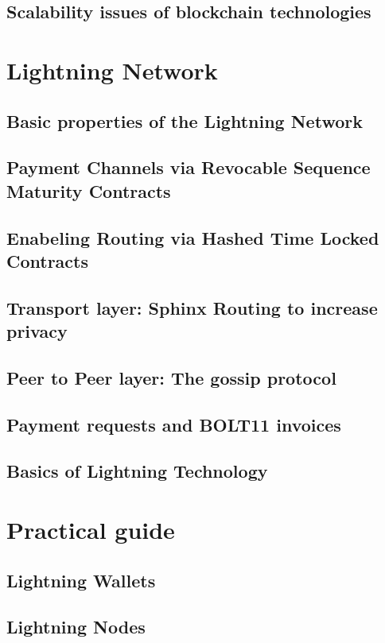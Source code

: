 \documentclass[a4paper,12pt,oneside,openany]{book}
\begin{document}


\section{Scalability issues of blockchain technologies}
\chapter{Lightning Network}
\section{Basic properties of the Lightning Network}
\section{Payment Channels via Revocable Sequence Maturity Contracts}
\section{Enabeling Routing via Hashed Time Locked Contracts}
\section{Transport layer: Sphinx Routing to increase privacy}
\section{Peer to Peer layer: The gossip protocol}
\section{Payment requests and BOLT11 invoices}
\section{Basics of Lightning Technology}
\chapter{Practical guide}
\section{Lightning Wallets}
\section{Lightning Nodes}
\end{document}
